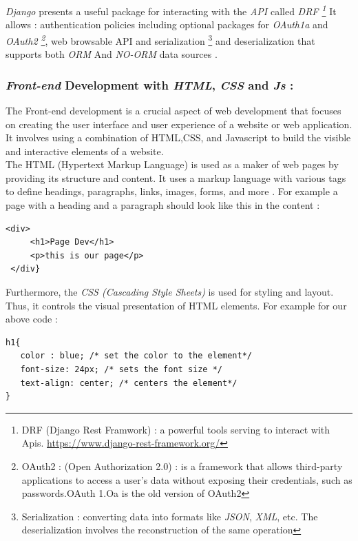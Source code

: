 \documentclass[12pt,a4paper, oneside]{book}
\begin{document}
\textit{Django} presents a useful package for interacting with the \textit{API} called \textit{DRF \footnote{DRF (Django Rest Framwork) : a powerful tools serving to interact with Apis. \url{https://www.django-rest-framework.org/}}} It allows : authentication policies including optional packages for \textit{OAuth1a} and \textit{OAuth2 \footnote{OAuth2 :   (Open Authorization 2.0) : is a framework that allows third-party applications to access a user's data without exposing their credentials, such as passwords.OAuth 1.Oa is the old version of OAuth2  }}, web browsable API  and serialization \footnote{Serialization : converting data into formats like \textit{JSON}, \textit{XML}, etc. The deserialization involves the reconstruction of the same operation} and deserialization that supports both \textit{ORM} And \textit{NO-ORM} data sources \cite{nader2023django}. 
 
\subsubsection{\large \textit{Front-end} Development with \textit{HTML}, \textit{CSS} and \textit{Js} :} 
The Front-end development is a crucial aspect of web development that focuses on creating the user interface and user experience of a website or web application. It involves using a combination of HTML,CSS, and Javascript to build the visible and interactive elements of a website. \\

The HTML (Hypertext Markup Language) is used as a maker of web pages by providing its structure and content. It uses a markup language with various tags to define headings, paragraphs, links, images, forms, and more \cite{stark2010building}. For example a page with a heading and a paragraph should look like this in the content :
\begin{lstlisting}[style=htmlcssjsstyle]
 <div>
     <h1>Page Dev</h1>
     <p>this is our page</p>
 </div}
\end{lstlisting}

Furthermore, the \textit{CSS (Cascading Style Sheets)} is used for styling and layout. Thus, it controls the visual presentation of HTML elements. For example for our above code : \newline
\begin{lstlisting}[style=htmlcssjsstyle]
h1{
   color : blue; /* set the color to the element*/
   font-size: 24px; /* sets the font size */
   text-align: center; /* centers the element*/
}
\end{lstlisting} 
\end{document}
